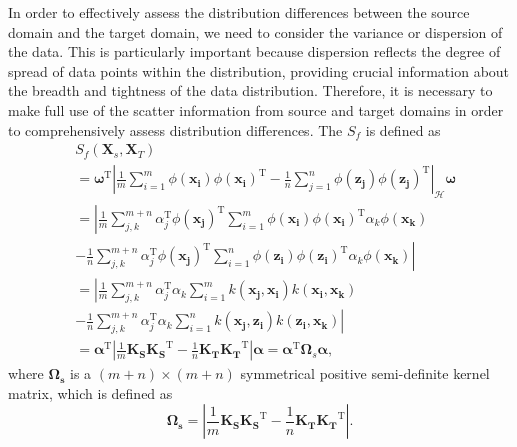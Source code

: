 \documentclass[a4paper]{cas-sc}
\begin{document}
In order to effectively assess the distribution differences between the source domain and the target domain, we need to consider the variance or dispersion of the data. This is particularly important because dispersion reflects the degree of spread of data points within the distribution, providing crucial information about the breadth and tightness of the data distribution. 
Therefore, it is necessary to make full use of the scatter information from source and target domains in order to comprehensively assess distribution differences. 
The $S_f$ is defined as
\begin{equation}\label{Sf}
\begin{aligned}
&S_f \left({\boldsymbol{X}}_{s}, {\boldsymbol{X}}_{T}\right) \\
& ={\boldsymbol{\omega}}^\mathrm{T}\left|\frac{1}{m} \sum_{i=1}^{m} \phi\left(\boldsymbol{x_i}\right) \phi\left(\boldsymbol{x_i}\right)^\mathrm{T}-\frac{1}{n} \sum_{j=1}^{n} \phi\left(\boldsymbol{z_j}\right)\phi\left(\boldsymbol{z_j}\right)^\mathrm{T}\right|_{\mathcal{H}} {\boldsymbol{\omega}} \\
& =\left| \frac{1}{m} \sum_{j, k}^{m+n} \alpha_{j}^\mathrm{T} \phi\left(\boldsymbol{x_j}\right)^\mathrm{T} \sum_{i=1}^{m} \phi\left(\boldsymbol{x_i}\right)\phi\left(\boldsymbol{x_i}\right)^\mathrm{T} \alpha_{k} \phi\left(\boldsymbol{x_k}\right) \right.\\
& - \left. \frac{1}{n} \sum_{j, k}^{m+n} \alpha_{j}^\mathrm{T} \phi\left(\boldsymbol{x_j}\right)^\mathrm{T} \sum_{i=1}^{n} \phi\left(\boldsymbol{z_i}\right)\phi\left(\boldsymbol{z_i}\right)^\mathrm{T} \alpha_{k} \phi\left(\boldsymbol{x_k}\right) \right| \\
& =\left| \frac{1}{m} \sum_{j, k}^{m+n} \alpha_{j}^\mathrm{T} \alpha_{k} \sum_{i=1}^{m} k\left(\boldsymbol{x_j}, \boldsymbol{x_i}\right) k\left(\boldsymbol{x_i}, \boldsymbol{x_k}\right) \right. \\
& - \left. \frac{1}{n} \sum_{j, k}^{m+n} \alpha_{j}^\mathrm{T} \alpha_{k} \sum_{i=1}^{n} k\left(\boldsymbol{x_j}, \boldsymbol{z_i}\right) k\left(\boldsymbol{z_i}, \boldsymbol{x_k}\right) \right| \\
& ={\boldsymbol{\alpha}}^\mathrm{T}\left|\frac{1}{m} \boldsymbol{K_S} \boldsymbol{K_S}^\mathrm{T}-\frac{1}{n} \boldsymbol{K_T} \boldsymbol{K_T}^\mathrm{T}\right| {\boldsymbol{\alpha}}={\boldsymbol{\alpha}}^\mathrm{T} {\boldsymbol{\Omega}}_{s} {\boldsymbol{\alpha}},
\end{aligned}
\end{equation}
where $\boldsymbol{\Omega_s}$ is a
$(m + n) \times (m + n)$ symmetrical positive semi-definite kernel matrix, which is defined as
\begin{equation}
\boldsymbol{\Omega_s} = \left|\frac{1}{m} \boldsymbol{K_S} \boldsymbol{K_S}^\mathrm{T}-\frac{1}{n} \boldsymbol{K_T} \boldsymbol{K_T}^\mathrm{T}\right|.
\end{equation}
\end{document}
